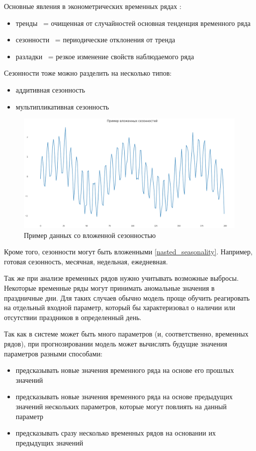 Основные явления в эконометрических временных рядах \cite{voron}:
\begin{itemize}
	\item тренды ~= очищенная от случайностей основная тенденция временного ряда
	\item сезонности ~= периодические отклонения от тренда
	\item разладки ~= резкое изменение свойств наблюдаемого ряда
\end{itemize}

Сезонности тоже можно разделить на несколько типов:

\begin{itemize}
	\item аддитивная сезонность
	\item мультипликативная сезонность
\end{itemize}

\def\figurename{Рис}
\begin{figure}[t]%
	\begin{center}
	\includegraphics[width=.5\columnwidth]{./img/nasted_seasonality.png}%
	\end{center}
	\caption{Пример данных со вложенной сезонностью}%
	\label{pic:nasted_seasonality}%
\end{figure}

Кроме того, сезонности могут быть вложенными \ref{nasted_seasonality}. Например, готовая сезонность, месячная,
недельная, ежедневная.



Так же при анализе временных рядов нужно учитывать возможные выбросы.
Некоторые временные ряды могут принимать аномальные значения в праздничные дни.
Для таких случаев обычно модель проще обучить реагировать на отдельный входной
параметр, который бы характеризовал о наличии или отсутствии праздников в
определенный день.

Так как в системе может быть много параметров (и, соответственно, временных рядов),
при прогнозировании модель может вычислять будущие значения параметров разными способами:

\begin{itemize}
	\item предсказывать новые значения временного ряда на основе его прошлых значений
	\item предсказывать новые значения временного ряда на основе предыдущих значений
	нескольких параметров, которые могут повлиять на данный параметр
	\item предсказывать сразу несколько временных рядов на основании их предыдущих значений
\end{itemize}

